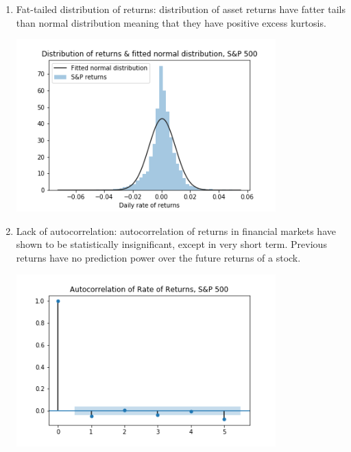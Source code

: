\begin{enumerate}
    \item Fat-tailed distribution of returns: distribution of asset returns have fatter tails than normal distribution meaning that they have positive excess kurtosis. 
    \par
    \begin{minipage}{\linewidth}
        \centering
        \includegraphics[width=10cm]{plots/S&P500_fat_tails.png}
    \end{minipage}

    \item Lack of autocorrelation: autocorrelation of returns in financial markets have shown to be statistically insignificant, except in very short term. Previous returns have no prediction power over the future returns of a stock. 
    \par
    \begin{minipage}{\linewidth}
        \centering
        \includegraphics[width=10cm]{plots/S&P500_autocorr.png}
    \end{minipage}


\end{enumerate}
